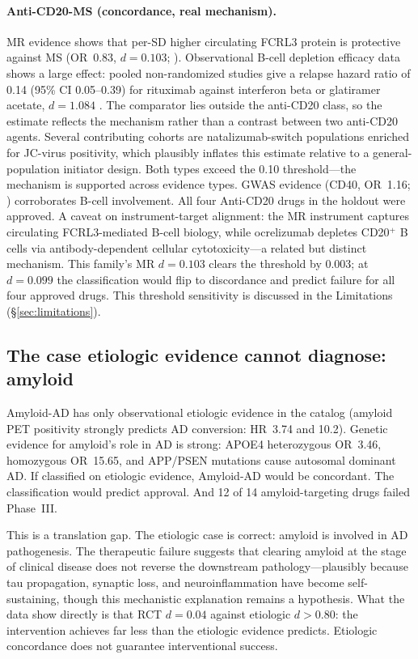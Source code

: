\documentclass[11pt]{article}
\begin{document}
\paragraph{Anti-CD20-MS (concordance, real mechanism).} MR evidence shows that per-SD higher circulating FCRL3 protein is protective against MS (OR~0.83, $d = 0.103$; \cite{lin2023}). Observational B-cell depletion efficacy data shows a large effect: pooled non-randomized studies give a relapse hazard ratio of 0.14 (95\% CI 0.05--0.39) for rituximab against interferon beta or glatiramer acetate, $d = 1.084$ \cite{hu2019}. The comparator lies outside the anti-CD20 class, so the estimate reflects the mechanism rather than a contrast between two anti-CD20 agents. Several contributing cohorts are natalizumab-switch populations enriched for JC-virus positivity, which plausibly inflates this estimate relative to a general-population initiator design. Both types exceed the 0.10 threshold---the mechanism is supported across evidence types. GWAS evidence (CD40, OR~1.16; \cite{sokolova2013}) corroborates B-cell involvement. All four Anti-CD20 drugs in the holdout were approved. A caveat on instrument-target alignment: the MR instrument captures circulating FCRL3-mediated B-cell biology, while ocrelizumab depletes CD20$^+$ B cells via antibody-dependent cellular cytotoxicity---a related but distinct mechanism. This family's MR $d = 0.103$ clears the threshold by 0.003; at $d = 0.099$ the classification would flip to discordance and predict failure for all four approved drugs. This threshold sensitivity is discussed in the Limitations (\S\ref{sec:limitations}).

\subsection{The case etiologic evidence cannot diagnose: amyloid}
\label{sec:amyloid}

Amyloid-AD has only observational etiologic evidence in the catalog (amyloid PET positivity strongly predicts AD conversion: HR~3.74 and 10.2). Genetic evidence for amyloid's role in AD is strong: APOE4 heterozygous OR~3.46, homozygous OR~15.65, and APP/PSEN mutations cause autosomal dominant AD. If classified on etiologic evidence, Amyloid-AD would be concordant. The classification would predict approval. And 12 of 14 amyloid-targeting drugs failed Phase~III.

This is a translation gap. The etiologic case is correct: amyloid is involved in AD pathogenesis. The therapeutic failure suggests that clearing amyloid at the stage of clinical disease does not reverse the downstream pathology---plausibly because tau propagation, synaptic loss, and neuroinflammation have become self-sustaining, though this mechanistic explanation remains a hypothesis. What the data show directly is that RCT $d = 0.04$ against etiologic $d > 0.80$: the intervention achieves far less than the etiologic evidence predicts. Etiologic concordance does not guarantee interventional success.
\end{document}
